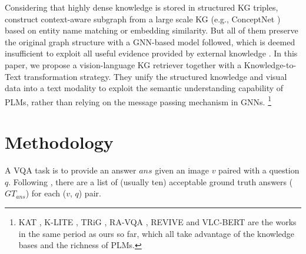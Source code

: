 \documentclass[sigconf]{acmart}
\begin{document}
Considering that highly dense knowledge is stored in structured KG triples,  
\citep{DBLP:journals/pami/WangWSDH18,DBLP:conf/nips/NarasimhanLS18,DBLP:conf/ijcai/ZhuYWS0W20} construct context-aware subgraph from a large scale KG (e.g., ConceptNet \cite{DBLP:conf/aaai/SpeerCH17}) 
based on entity name matching or embedding similarity.
But all of them preserve the original graph structure with a GNN-based model followed, which is deemed insufficient to exploit all useful evidence provided by external knowledge \citep{DBLP:conf/aaai/BianH0021}.
In this paper, we propose a vision-language KG retriever together with a Knowledge-to-Text transformation strategy. 
They unify the structured knowledge and visual data into a text modality to exploit the semantic understanding capability of PLMs, rather than relying on the message passing mechanism in GNNs. 
\footnote{KAT \citep{DBLP:conf/naacl/GuiWH0BG22}, K-LITE \citep{DBLP:journals/corr/abs-2204-09222}, TRiG \citep{DBLP:journals/corr/abs-2201-05299}, RA-VQA \citep{DBLP:journals/corr/abs-2210-03809}, REVIVE \citep{DBLP:journals/corr/abs-2206-01201}  and VLC-BERT \citep{DBLP:journals/corr/abs-2210-13626} are the works in the same period as ours so far, which all take advantage of the knowledge bases and the richness of PLMs.}

\section{Methodology}
A VQA task is to provide an answer $ans$ given an image $v$ paired with a question $q$.
 Following \citep{antol2015vqa},  there are a list of (usually ten) acceptable ground truth answers ($GT_{ans}$) for each ($v$, $q$) pair.
\end{document}

